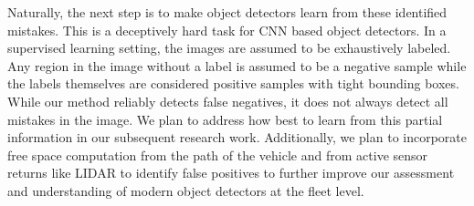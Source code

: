 \documentclass[letterpaper, 10 pt, journal, twoside]{IEEEtran}  %
\begin{document}
Naturally, the next step is to make object detectors learn from these identified mistakes. This is a deceptively hard task for CNN based object detectors. In a supervised learning setting, the images are assumed to be exhaustively labeled. Any region in the image without a label is assumed to be a negative sample while the labels themselves are considered positive samples with tight bounding boxes. While our method reliably detects false negatives, it does not always detect all mistakes in the image.
We plan to address how best to learn from this partial information in our subsequent research work. Additionally, we plan to incorporate free space computation from the path of the vehicle and from active sensor returns like LIDAR to identify false positives to further improve our assessment and understanding of modern object detectors at the fleet level. 











\end{document}

